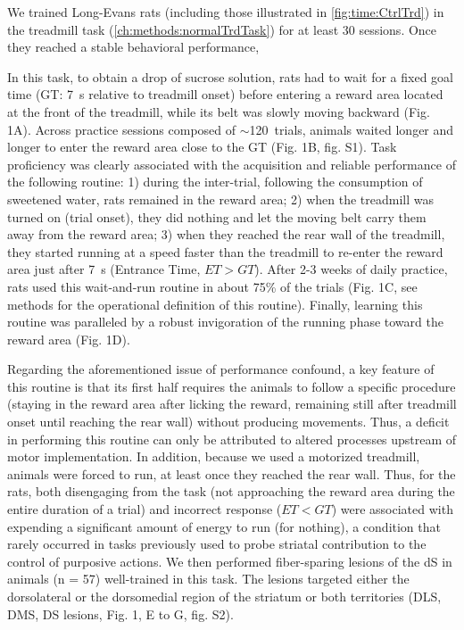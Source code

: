 We trained Long-Evans rats (including those illustrated in \autoref{fig:time:CtrlTrd}) in the treadmill task (\autoref{ch:methods:normalTrdTask}) for at least 30 sessions.
Once they reached a stable behavioral performance, 

In this task, to obtain a drop of sucrose solution, rats had to wait for a fixed goal time (GT: 7~s relative to treadmill onset) before entering a reward area located at the front of the treadmill, while its belt was slowly moving backward (Fig. 1A).
Across practice sessions composed of $\sim$120~trials, animals waited longer and longer to enter the reward area close to the GT (Fig. 1B, fig. S1).
Task proficiency was clearly associated with the acquisition and reliable performance of the following routine: 1) during the inter-trial, following the consumption of sweetened water, rats remained in the reward area; 2) when the treadmill was turned on (trial onset), they did nothing and let the moving belt carry them away from the reward area; 3) when they reached the rear wall of the treadmill, they started running at a speed faster than the treadmill to re-enter the reward area just after 7~s (Entrance Time, $ET>GT$).
After 2-3 weeks of daily practice, rats used this wait-and-run routine in about 75\% of the trials (Fig. 1C, see methods for the operational definition of this routine).
Finally, learning this routine was paralleled by a robust invigoration of the running phase toward the reward area (Fig. 1D). 
\par
Regarding the aforementioned issue of performance confound, a key feature of this routine is that its first half requires the animals to follow a specific procedure (staying in the reward area after licking the reward, remaining still after treadmill onset until reaching the rear wall) without producing movements. 
Thus, a deficit in performing this routine can only be attributed to altered processes upstream of motor implementation.
In addition, because we used a motorized treadmill, animals were forced to run, at least once they reached the rear wall.
Thus, for the rats, both disengaging from the task (not approaching the reward area during the entire duration of a trial) and incorrect response ($ET<GT$) were associated with expending a significant amount of energy to run (for nothing), a condition that rarely occurred in tasks previously used to probe striatal contribution to the control of purposive actions.
We then performed fiber-sparing lesions of the dS in animals (n = 57) well-trained in this task.
The lesions targeted either the dorsolateral or the dorsomedial region of the striatum or both territories (DLS, DMS, DS lesions, Fig. 1, E to G, fig. S2). 
